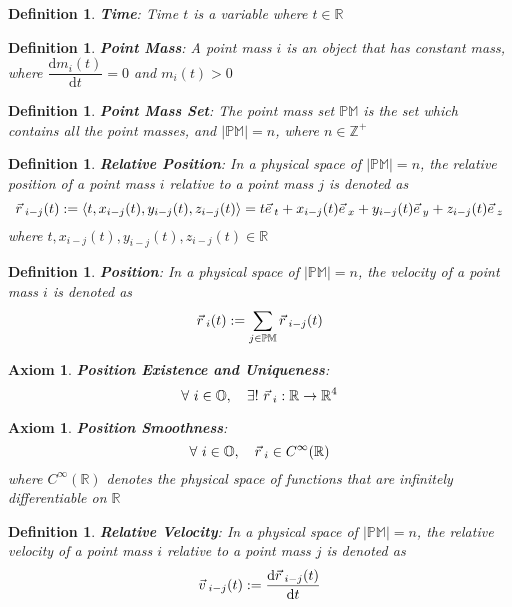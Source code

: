 \documentclass[12pt]{amsart}
\newtheorem{definition}[theorem]{Definition}
\newtheorem{axiom}[theorem]{Axiom}
\let\oldvec\vec
\renewcommand{\vec}[1]{\oldvec{#1}\hspace{0.1em}}
\begin{document}
\begin{definition}
\textbf{Time}: Time $t$ is a variable where $t \in \mathbb{R}$ 
\end{definition}

\begin{definition}
\textbf{Point Mass}: A point mass $i$ is an object that has constant mass, where $\dfrac{\mathrm{d} m_i (t)}{\mathrm{d} t} = 0$ and $m_i (t) > 0$
\end{definition}

\begin{definition}
\textbf{Point Mass Set}: The point mass set $\mathbb{PM}$ is the set which contains all the point masses, and $\left | \mathbb{PM} \right | = n$, where $n \in \mathbb{Z}^{+}$
\end{definition}

\begin{definition}
\textbf{Relative Position}: In a physical space of $\left | \mathbb{PM} \right | = n$, the relative position of a point mass $i$ relative to a point mass $j$ is denoted as
$$\vec{r}_{i-j} (t) := \left< t, x_{i-j}(t), y_{i-j}(t), z_{i-j}(t) \right> = t\vec{e}_t + x_{i-j}(t) \vec{e}_x + y_{i-j}(t) \vec{e}_y + z_{i-j}(t) \vec{e}_z $$
where $t, x_{i-j}(t), y_{i-j}(t), z_{i-j}(t) \in \mathbb{R}$
\end{definition}

\begin{definition}
\textbf{Position}: In a physical space of $\left | \mathbb{PM} \right | = n$, the velocity of a point mass $i$ is denoted as
$$\vec{r}_i(t) :=\displaystyle \sum_{j \in \mathbb{PM}} \vec{r}_{i-j} (t)$$
\end{definition}

\begin{axiom}
\textbf{Position Existence and Uniqueness}: $$\forall \  i \in \mathbb{O}, \quad \exists!\ \vec{r}_i : \mathbb{R} \to \mathbb{R}^4$$
\end{axiom}

\begin{axiom}
\textbf{Position Smoothness}:
$$
\forall \  i \in \mathbb{O}, \quad \vec{r}_i \in C^{\infty}(\mathbb{R})
$$
where $C^{\infty}(\mathbb{R})$ denotes the physical space of functions that are infinitely differentiable on $\mathbb{R}$

\end{axiom}

\begin{definition}
\textbf{Relative Velocity}: In a physical space of $\left | \mathbb{PM} \right | = n$, the relative velocity of a point mass $i$ relative to a point mass $j$ is denoted as
$$\vec{v}_{i-j} (t) := \dfrac{\mathrm{d} \vec{r}_{i-j}(t)}{\mathrm{d} t} $$
\end{definition}
\end{document}
